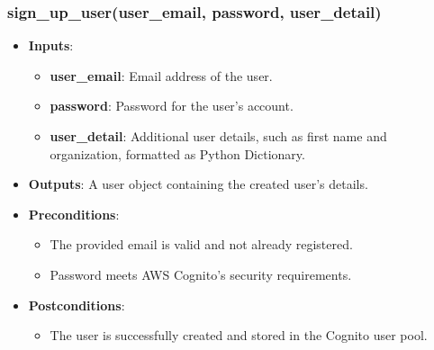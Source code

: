 \documentclass[12pt, titlepage]{article}
\begin{document}
\subsubsection{sign\_up\_user(user\_email, password, user\_detail)}
\begin{itemize}
    \item \textbf{Inputs}:
        \begin{itemize}
            \item \textbf{user\_email}: Email address of the user.
            \item \textbf{password}: Password for the user's account.
            \item \textbf{user\_detail}: Additional user details, such as first name and organization, formatted as Python Dictionary.
        \end{itemize}
    \item \textbf{Outputs}: A user object containing the created user's details.
    \item \textbf{Preconditions}: 
        \begin{itemize}
            \item The provided email is valid and not already registered.
            \item Password meets AWS Cognito's security requirements.
        \end{itemize}
    \item \textbf{Postconditions}: 
        \begin{itemize}
            \item The user is successfully created and stored in the Cognito user pool.
        \end{itemize}
\end{itemize}
\end{document}
